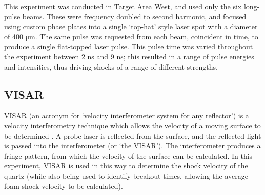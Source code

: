 

This experiment was conducted in Target Area West, and used only the six long-pulse beams. These were frequency doubled to second harmonic, and focused using custom phase plates into a single `top-hat' style laser spot with a diameter of 400 \unit{\micro\meter}. The same pulse was requested from each beam, coincident in time, to produce a single flat-topped laser pulse. This pulse time was varied throughout the experiment between 2 \unit{\nano\second} and 9 \unit{\nano\second}; this resulted in a range of pulse energies and intensities, thus driving shocks of a range of different strengths.

\subsection{VISAR}

VISAR (an acronym for `velocity interferometer system for any reflector') is a velocity interferometry technique which allows the velocity of a moving surface to be determined \cite{Barker2000, Barker1972}. A probe laser is reflected from the surface, and the reflected light is passed into the interferometer (or `the VISAR'). The interferometer produces a fringe pattern, from which the velocity of the surface can be calculated. In this experiment, VISAR is used in this way to determine the shock velocity of the quartz (while also being used to identify breakout times, allowing the average foam shock velocity to be calculated).

